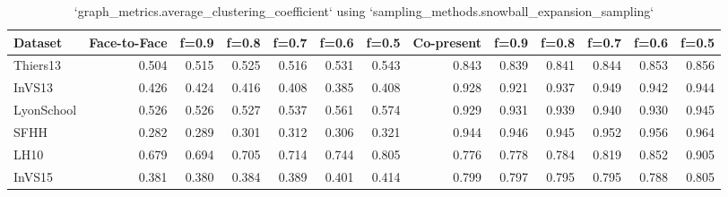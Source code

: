 \begin{table}[ht]
\begin{tabular}{lrrrrrrrrrrrr}
\hline
 Dataset    &   Face-to-Face &   f=0.9 &   f=0.8 &   f=0.7 &   f=0.6 &   f=0.5 &   Co-present &   f=0.9 &   f=0.8 &   f=0.7 &   f=0.6 &   f=0.5 \\
\hline
 Thiers13   &          0.504 &   0.515 &   0.525 &   0.516 &   0.531 &   0.543 &        0.843 &   0.839 &   0.841 &   0.844 &   0.853 &   0.856 \\
 InVS13     &          0.426 &   0.424 &   0.416 &   0.408 &   0.385 &   0.408 &        0.928 &   0.921 &   0.937 &   0.949 &   0.942 &   0.944 \\
 LyonSchool &          0.526 &   0.526 &   0.527 &   0.537 &   0.561 &   0.574 &        0.929 &   0.931 &   0.939 &   0.940 &   0.930 &   0.945 \\
 SFHH       &          0.282 &   0.289 &   0.301 &   0.312 &   0.306 &   0.321 &        0.944 &   0.946 &   0.945 &   0.952 &   0.956 &   0.964 \\
 LH10       &          0.679 &   0.694 &   0.705 &   0.714 &   0.744 &   0.805 &        0.776 &   0.778 &   0.784 &   0.819 &   0.852 &   0.905 \\
 InVS15     &          0.381 &   0.380 &   0.384 &   0.389 &   0.401 &   0.414 &        0.799 &   0.797 &   0.795 &   0.795 &   0.788 &   0.805 \\
\hline
\end{tabular}
\caption{`graph_metrics.average_clustering_coefficient` using `sampling_methods.snowball_expansion_sampling`}
\end{table}